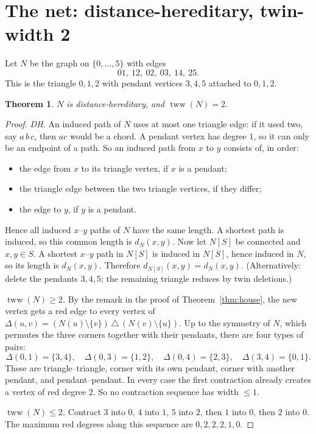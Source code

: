 \documentclass[11pt]{article}
\newtheorem{theorem}{Theorem}
\theoremstyle{definition}
\theoremstyle{remark}
\begin{document}
\section{The net: distance-hereditary, twin-width 2}
Let $N$ be the graph on $\{0,\dots,5\}$ with edges
\[ 01,\ 12,\ 02,\ 03,\ 14,\ 25 . \]
This is the triangle $0,1,2$ with pendant vertices $3,4,5$ attached to $0,1,2$.

\begin{theorem}\label{thm:net}
$N$ is distance-hereditary, and $\operatorname{tww}(N)=2$.
\end{theorem}

\begin{proof}
\emph{DH.} An induced path of $N$ uses at most one triangle edge: if it used two, say
$a\,b\,c$, then $ac$ would be a chord. A pendant vertex has degree $1$, so it can only be
an endpoint of a path. So an induced path from $x$ to $y$ consists of, in order:
\begin{itemize}
\item the edge from $x$ to its triangle vertex, if $x$ is a pendant;
\item the triangle edge between the two triangle vertices, if they differ;
\item the edge to $y$, if $y$ is a pendant.
\end{itemize}
Hence all induced $x$--$y$ paths of $N$ have the same length. A shortest path is
induced, so this common length is $d_N(x,y)$. Now let $N[S]$ be connected and
$x,y\in S$. A shortest $x$--$y$ path in $N[S]$ is induced in $N[S]$, hence induced in $N$, so its length is $d_N(x,y)$. Therefore
$d_{N[S]}(x,y)=d_N(x,y)$.
(Alternatively: delete the pendants $3,4,5$; the remaining triangle reduces by twin
deletions.)

\emph{$\operatorname{tww}(N)\ge2$.} By the remark in the proof of
Theorem~\ref{thm:house}, the new vertex gets a red edge to every vertex of
$\Delta(u,v)=(N(u)\setminus\{v\})\,\triangle\,(N(v)\setminus\{u\})$. Up to the symmetry of
$N$, which permutes the three corners together with their pendants, there are four types of
pairs:
\[
\Delta(0,1)=\{3,4\},\quad \Delta(0,3)=\{1,2\},\quad \Delta(0,4)=\{2,3\},\quad \Delta(3,4)=\{0,1\}.
\]
These are triangle--triangle, corner with its own pendant, corner with another pendant,
and pendant--pendant. In every case the first contraction already creates a vertex of
red degree $2$. So no contraction sequence has width $\le1$.

\emph{$\operatorname{tww}(N)\le2$.} Contract $3$ into $0$, $4$ into $1$, $5$ into $2$,
then $1$ into $0$, then $2$ into $0$. The maximum red degrees along this sequence are
$0,2,2,2,1,0$.
\end{proof}
\end{document}
